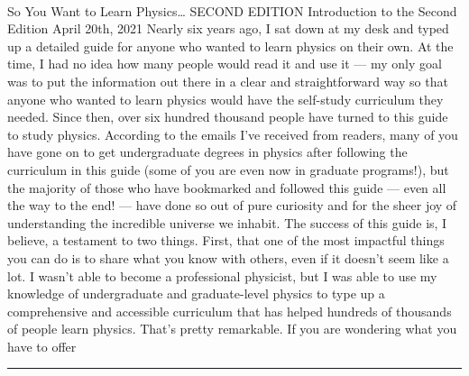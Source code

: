 \documentclass[10pt,a4paper]{article}
\begin{document}
\begin{multicols*}{2}
\paragraph{}
So You Want to Learn Physics…
SECOND EDITION
Introduction to the Second Edition
April 20th, 2021
Nearly six years ago, I sat down at my desk and typed up a detailed guide for anyone who wanted to learn physics on their own. At the time, I had no idea how many people would read it and use it — my only goal was to put the information out there in a clear and straightforward way so that anyone who wanted to learn physics would have the self-study curriculum they needed. Since then, over six hundred thousand people have turned to this guide to study physics.
According to the emails I’ve received from readers, many of you have gone on to get undergraduate degrees in physics after following the curriculum in this guide (some of you are even now in graduate programs!), but the majority of those who have bookmarked and followed this guide — even all the way to the end! — have done so out of pure curiosity and for the sheer joy of understanding the incredible universe we inhabit.
The success of this guide is, I believe, a testament to two things.
First, that one of the most impactful things you can do is to share what you know with others, even if it doesn’t seem like a lot. I wasn’t able to become a professional physicist, but I was able to use my knowledge of undergraduate and graduate-level physics to type up a comprehensive and accessible curriculum that has helped hundreds of thousands of people learn physics. That’s pretty remarkable. If you are wondering what you have to offer 
\par\noindent\textcolor{red}{\rule{\linewidth}{0.2mm}}
\vfill
\null
\noindent\begin{minipage}{\linewidth}

\end{minipage}
\end{multicols*}
\end{document}

